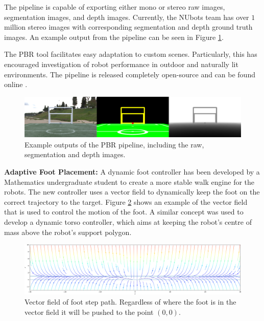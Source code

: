 \documentclass{llncs}
\begin{document}
The pipeline is capable of exporting either mono or stereo raw images, segmentation images, and depth images. Currently, the NUbots team has over $1$ million stereo images with corresponding segmentation and depth ground truth images. An example output from the pipeline can be seen in Figure \ref{fig:pbrExample}.

The PBR tool facilitates easy adaptation to custom scenes. Particularly, this has encouraged investigation of robot performance in outdoor and naturally lit environments. The pipeline is released completely open-source and can be found online \cite{nubotsNUpbrGit}.\\

\begin{figure}[h!]
    \centering
    \includegraphics[width=0.99\linewidth]{NUpbr.png}
    \caption{Example outputs of the PBR pipeline, including the raw, segmentation and depth images.}
    \label{fig:pbrExample}
\end{figure}

\noindent\textbf{Adaptive Foot Placement:}
A dynamic foot controller has been developed by a Mathematics undergraduate student to create a more stable walk engine for the robots. The new controller uses a vector field to dynamically keep the foot on the correct trajectory to the target. Figure \ref{fig:vec_field} shows an example of the vector field that is used to control the motion of the foot. A similar concept was used to develop a dynamic torso controller, which aims at keeping the robot's centre of mass above the robot's support polygon.\\

\begin{figure}[h!]
    \centering
    \includegraphics[width=0.99\linewidth]{VectorFieldPlot.png}
    \caption{Vector field of foot step path. Regardless of where the foot is in the vector field it will be pushed to the point $\left(0, 0\right)$.}
    \label{fig:vec_field}
\end{figure}
\end{document}
